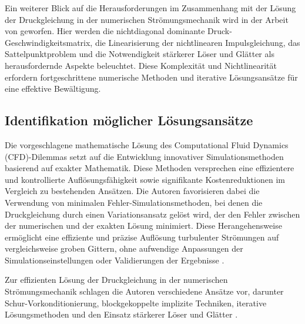 Ein weiterer Blick auf die Herausforderungen im Zusammenhang mit der Lösung der Druckgleichung in der numerischen Strömungsmechanik wird in der Arbeit von \parencite{jasakPracticalComputationalFluid2020} geworfen. Hier werden die nichtdiagonal dominante Druck-Geschwindigkeitsmatrix, die Linearisierung der nichtlinearen Impulsgleichung, das Sattelpunktproblem und die Notwendigkeit stärkerer Löser und Glätter als herausfordernde Aspekte beleuchtet. Diese Komplexität und Nichtlinearität erfordern fortgeschrittene numerische Methoden und iterative Lösungsansätze für eine effektive Bewältigung.

\subsection{Identifikation möglicher Lösungsansätze}

Die vorgeschlagene mathematische Lösung des Computational Fluid Dynamics (CFD)-Dilemmas setzt auf die Entwicklung innovativer Simulationsmethoden basierend auf exakter Mathematik. Diese Methoden versprechen eine effizientere und kontrollierte Auflösungsfähigkeit sowie signifikante Kostenreduktionen im Vergleich zu bestehenden Ansätzen. Die Autoren favorisieren dabei die Verwendung von minimalen Fehler-Simulationsmethoden, bei denen die Druckgleichung durch einen Variationsansatz gelöst wird, der den Fehler zwischen der numerischen und der exakten Lösung minimiert. Diese Herangehensweise ermöglicht eine effiziente und präzise Auflösung turbulenter Strömungen auf vergleichsweise groben Gittern, ohne aufwendige Anpassungen der Simulationseinstellungen oder Validierungen der Ergebnisse \parencite{heinzMathematicalSolutionComputational2023}.

Zur effizienten Lösung der Druckgleichung in der numerischen Strömungsmechanik schlagen die Autoren verschiedene Ansätze vor, darunter Schur-Vorkonditionierung, blockgekoppelte implizite Techniken, iterative Lösungsmethoden und den Einsatz stärkerer Löser und Glätter \parencite{jasakPracticalComputationalFluid2020}.